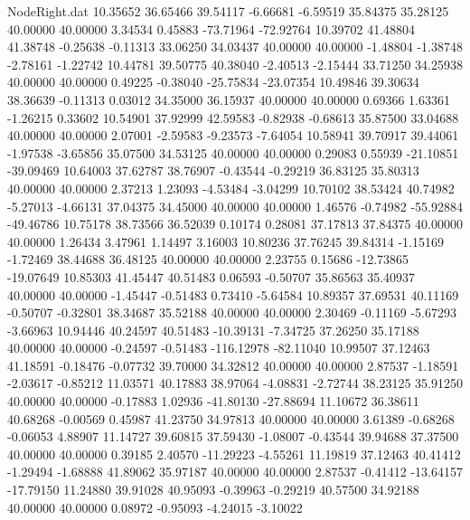 \begin{filecontents}{NodeRight.dat}
  10.35652   36.65466   39.54117    -6.66681   -6.59519   35.84375   35.28125   40.00000   40.00000    3.34534    0.45883  -73.71964  -72.92764
  10.39702   41.48804   41.38748    -0.25638   -0.11313   33.06250   34.03437   40.00000   40.00000   -1.48804   -1.38748   -2.78161   -1.22742
  10.44781   39.50775   40.38040    -2.40513   -2.15444   33.71250   34.25938   40.00000   40.00000    0.49225   -0.38040  -25.75834  -23.07354
  10.49846   39.30634   38.36639    -0.11313    0.03012   34.35000   36.15937   40.00000   40.00000    0.69366    1.63361   -1.26215    0.33602
  10.54901   37.92999   42.59583    -0.82938   -0.68613   35.87500   33.04688   40.00000   40.00000    2.07001   -2.59583   -9.23573   -7.64054
  10.58941   39.70917   39.44061    -1.97538   -3.65856   35.07500   34.53125   40.00000   40.00000    0.29083    0.55939  -21.10851  -39.09469
  10.64003   37.62787   38.76907    -0.43544   -0.29219   36.83125   35.80313   40.00000   40.00000    2.37213    1.23093   -4.53484   -3.04299
  10.70102   38.53424   40.74982    -5.27013   -4.66131   37.04375   34.45000   40.00000   40.00000    1.46576   -0.74982  -55.92884  -49.46786
  10.75178   38.73566   36.52039     0.10174    0.28081   37.17813   37.84375   40.00000   40.00000    1.26434    3.47961    1.14497    3.16003
  10.80236   37.76245   39.84314    -1.15169   -1.72469   38.44688   36.48125   40.00000   40.00000    2.23755    0.15686  -12.73865  -19.07649
  10.85303   41.45447   40.51483     0.06593   -0.50707   35.86563   35.40937   40.00000   40.00000   -1.45447   -0.51483    0.73410   -5.64584
  10.89357   37.69531   40.11169    -0.50707   -0.32801   38.34687   35.52188   40.00000   40.00000    2.30469   -0.11169   -5.67293   -3.66963
  10.94446   40.24597   40.51483   -10.39131   -7.34725   37.26250   35.17188   40.00000   40.00000   -0.24597   -0.51483 -116.12978  -82.11040
  10.99507   37.12463   41.18591    -0.18476   -0.07732   39.70000   34.32812   40.00000   40.00000    2.87537   -1.18591   -2.03617   -0.85212
  11.03571   40.17883   38.97064    -4.08831   -2.72744   38.23125   35.91250   40.00000   40.00000   -0.17883    1.02936  -41.80130  -27.88694
  11.10672   36.38611   40.68268    -0.00569    0.45987   41.23750   34.97813   40.00000   40.00000    3.61389   -0.68268   -0.06053    4.88907
  11.14727   39.60815   37.59430    -1.08007   -0.43544   39.94688   37.37500   40.00000   40.00000    0.39185    2.40570  -11.29223   -4.55261
  11.19819   37.12463   40.41412    -1.29494   -1.68888   41.89062   35.97187   40.00000   40.00000    2.87537   -0.41412  -13.64157  -17.79150
  11.24880   39.91028   40.95093    -0.39963   -0.29219   40.57500   34.92188   40.00000   40.00000    0.08972   -0.95093   -4.24015   -3.10022

\end{filecontents}
